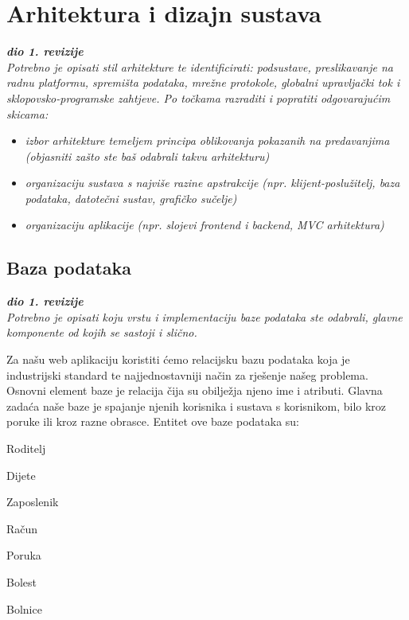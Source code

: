 \chapter{Arhitektura i dizajn sustava}
		
		\textbf{\textit{dio 1. revizije}}\\

		\textit{ Potrebno je opisati stil arhitekture te identificirati: podsustave, preslikavanje na radnu platformu, spremišta podataka, mrežne protokole, globalni upravljački tok i sklopovsko-programske zahtjeve. Po točkama razraditi i popratiti odgovarajućim skicama:}
	\begin{itemize}
		\item 	\textit{izbor arhitekture temeljem principa oblikovanja pokazanih na predavanjima (objasniti zašto ste baš odabrali takvu arhitekturu)}
		\item 	\textit{organizaciju sustava s najviše razine apstrakcije (npr. klijent-poslužitelj, baza podataka, datotečni sustav, grafičko sučelje)}
		\item 	\textit{organizaciju aplikacije (npr. slojevi frontend i backend, MVC arhitektura) }		
	\end{itemize}

	
		

		

				
		\section{Baza podataka}
			
			\textbf{\textit{dio 1. revizije}}\\
			
		\textit{Potrebno je opisati koju vrstu i implementaciju baze podataka ste odabrali, glavne komponente od kojih se sastoji i slično.}
		
		Za našu web aplikaciju koristiti ćemo relacijsku bazu podataka koja je industrijski standard te najjednostavniji način za rješenje našeg problema. Osnovni element baze je relacija čija su obilježja njeno ime i atributi. Glavna zadaća naše baze je spajanje njenih korisnika i sustava s korisnikom, bilo kroz poruke ili kroz razne obrasce.
		Entitet ove baze podataka su:
		
			\begin{packed_item}
				\item Roditelj
				\item Dijete
				\item Zaposlenik
				\item Račun
				\item Poruka
				\item Bolest
				\item Bolnice
			\end{packed_item}
		
